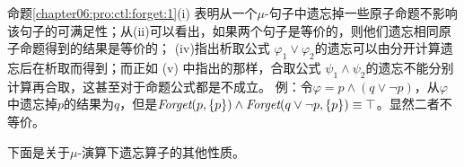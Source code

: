 命题\ref{chapter06:pro:ctl:forget:1}(i) 表明从一个$\mu$-句子中遗忘掉一些原子命题不影响该句子的可满足性；从(ii)可以看出，如果两个句子是等价的，则他们遗忘相同原子命题得到的结果是等价的； (iv)指出析取公式 $\varphi_1 \vee \varphi_2$的遗忘可以由分开计算遗忘后在析取而得到；而正如 (v) 中指出的那样，合取公式 $\psi_1 \wedge \psi_2$的遗忘不能分别计算再合取，这甚至对于命题公式都是不成立。
例：令$\varphi=p \wedge (q \vee \neg p)$，从$\varphi$中遗忘掉$p$的结果为$q$，但是$\textit{Forget}(p, \{p\}) \wedge \textit{Forget}(q\vee \neg p, \{p\}) \equiv \top$。显然二者不等价。




下面是关于$\mu$-演算下遗忘算子的其他性质。


